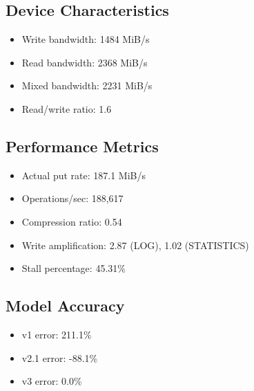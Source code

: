 \documentclass[11pt,twocolumn]{article}
\begin{document}
\subsection{Device Characteristics}
\begin{itemize}
    \item Write bandwidth: 1484 MiB/s
    \item Read bandwidth: 2368 MiB/s
    \item Mixed bandwidth: 2231 MiB/s
    \item Read/write ratio: 1.6
\end{itemize}

\subsection{Performance Metrics}
\begin{itemize}
    \item Actual put rate: 187.1 MiB/s
    \item Operations/sec: 188,617
    \item Compression ratio: 0.54
    \item Write amplification: 2.87 (LOG), 1.02 (STATISTICS)
    \item Stall percentage: 45.31\%
\end{itemize}

\subsection{Model Accuracy}
\begin{itemize}
    \item v1 error: 211.1\%
    \item v2.1 error: -88.1\%
    \item v3 error: 0.0\%
\end{itemize}
\end{document}
